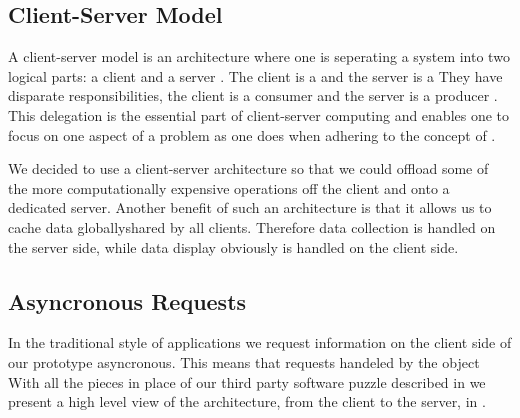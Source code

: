 \subsection{Client-Server Model}
A client-server model is an architecture where one is seperating a system into
two logical parts: a client and a server \citep[p.~3]{lewandowski98}. The
client is a 
and the server is a 
They have disparate responsibilities, the client is a consumer and the
server is a producer \citep[p.~3]{lewandowski98}. This delegation is the
essential part of client-server computing and enables one to focus on one
aspect of a problem as one does when adhering to the concept of
 \citep[p.~61]{dijkstra82}.


We decided to use a client-server architecture so that we could offload some
of the more computationally expensive operations off the client and onto a
dedicated server. Another benefit of such an architecture is that it allows us
to cache data globally\dash{}shared by all clients. Therefore data collection
is handled on the server side, while data display obviously is handled on
the client side.


\subsection{Asyncronous Requests}

In the traditional style of  applications we request information on
the client side of our prototype asyncronous. This means that requests
handeled by the  object
%
With all the pieces in place of our third party software puzzle described in
we present a high level view of the architecture, from the client to the
server, in
.

